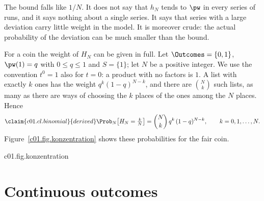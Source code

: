 \begin{vertiefung}
  The bound falls like $1/N$. It does not say that $h_N$ tends to $\pw$ in every series
  of runs, and it says nothing about a single series. It says that series with a large
  deviation carry little weight in the model. It is moreover crude: the actual probability
  of the deviation can be much smaller than the bound.

  For a coin the weight of $H_N$ can be given in full. Let
  $\Outcomes = \{0, 1\}$, $\pw(1) = q$ with $0 \leq q \leq 1$ and $S = \{1\}$; let $N$ be a
  positive integer. We use the convention $t^0 = 1$ also for $t = 0$: a product with no
  factors is $1$. A list with exactly $k$ ones has
  the weight $q^k (1-q)^{N-k}$, and there are $\binom{N}{k}$ such lists, as many as there
  are ways of choosing the $k$ places of the ones among the $N$ places. Hence
  \begin{equation}\label{c01.eq.binomial}\claim{c01.cl.binomial}{derived}
    \Prob_N\bigl[H_N = \tfrac{k}{N}\bigr] = \binom{N}{k}\, q^k\, (1-q)^{N-k},
    \qquad k = 0, 1, \dots, N .
  \end{equation}
  Figure~\ref{c01.fig.konzentration} shows these probabilities for the fair coin.

  \begin{tpcfigure}{c01.fig.konzentration}

    \caption{The weight of the relative frequency $H_N$ of “tails” for a fair coin,
      $q = \tfrac12$, by equation~\eqref{c01.eq.binomial} for $N = 4$, $16$ and $64$
      throws. Horizontally the value $k/N$ of $H_N$; the height of a line is its
      probability, in each picture in units of the largest value. The bracket marks the
      values with $\abs{H_N - \tfrac12} < \tfrac14$. As $N$ grows the weight gathers in
      the middle.}
  \end{tpcfigure}
\end{vertiefung}

\section{Continuous outcomes}\label{c01.s4}

